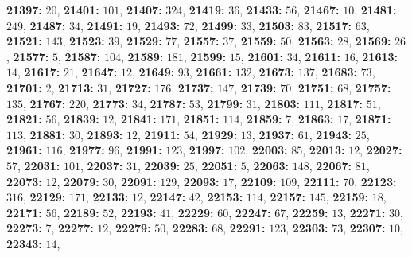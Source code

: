 \textsf{\bfseries 21397:} $20$, \textsf{\bfseries 21401:} $101$, \textsf{\bfseries 21407:} $324$, \textsf{\bfseries 21419:} $36$, \textsf{\bfseries 21433:} $56$, \textsf{\bfseries 21467:} $10$, \textsf{\bfseries 21481:} $249$, \textsf{\bfseries 21487:} $34$, \textsf{\bfseries 21491:} $19$, \textsf{\bfseries 21493:} $72$, \textsf{\bfseries 21499:} $33$, \textsf{\bfseries 21503:} $83$, \textsf{\bfseries 21517:} $63$, \textsf{\bfseries 21521:} $143$, \textsf{\bfseries 21523:} $39$, \textsf{\bfseries 21529:} $77$, \textsf{\bfseries 21557:} $37$, \textsf{\bfseries 21559:} $50$, \textsf{\bfseries 21563:} $28$, \textsf{\bfseries 21569:} $26$, \textsf{\bfseries 21577:} $5$, \textsf{\bfseries 21587:} $104$, \textsf{\bfseries 21589:} $181$, \textsf{\bfseries 21599:} $15$, \textsf{\bfseries 21601:} $34$, \textsf{\bfseries 21611:} $16$, \textsf{\bfseries 21613:} $14$, \textsf{\bfseries 21617:} $21$, \textsf{\bfseries 21647:} $12$, \textsf{\bfseries 21649:} $93$, \textsf{\bfseries 21661:} $132$, \textsf{\bfseries 21673:} $137$, \textsf{\bfseries 21683:} $73$, \textsf{\bfseries 21701:} $2$, \textsf{\bfseries 21713:} $31$, \textsf{\bfseries 21727:} $176$, \textsf{\bfseries 21737:} $147$, \textsf{\bfseries 21739:} $70$, \textsf{\bfseries 21751:} $68$, \textsf{\bfseries 21757:} $135$, \textsf{\bfseries 21767:} $220$, \textsf{\bfseries 21773:} $34$, \textsf{\bfseries 21787:} $53$, \textsf{\bfseries 21799:} $31$, \textsf{\bfseries 21803:} $111$, \textsf{\bfseries 21817:} $51$, \textsf{\bfseries 21821:} $56$, \textsf{\bfseries 21839:} $12$, \textsf{\bfseries 21841:} $171$, \textsf{\bfseries 21851:} $114$, \textsf{\bfseries 21859:} $7$, \textsf{\bfseries 21863:} $17$, \textsf{\bfseries 21871:} $113$, \textsf{\bfseries 21881:} $30$, \textsf{\bfseries 21893:} $12$, \textsf{\bfseries 21911:} $54$, \textsf{\bfseries 21929:} $13$, \textsf{\bfseries 21937:} $61$, \textsf{\bfseries 21943:} $25$, \textsf{\bfseries 21961:} $116$, \textsf{\bfseries 21977:} $96$, \textsf{\bfseries 21991:} $123$, \textsf{\bfseries 21997:} $102$, \textsf{\bfseries 22003:} $85$, \textsf{\bfseries 22013:} $12$, \textsf{\bfseries 22027:} $57$, \textsf{\bfseries 22031:} $101$, \textsf{\bfseries 22037:} $31$, \textsf{\bfseries 22039:} $25$, \textsf{\bfseries 22051:} $5$, \textsf{\bfseries 22063:} $148$, \textsf{\bfseries 22067:} $81$, \textsf{\bfseries 22073:} $12$, \textsf{\bfseries 22079:} $30$, \textsf{\bfseries 22091:} $129$, \textsf{\bfseries 22093:} $17$, \textsf{\bfseries 22109:} $109$, \textsf{\bfseries 22111:} $70$, \textsf{\bfseries 22123:} $316$, \textsf{\bfseries 22129:} $171$, \textsf{\bfseries 22133:} $12$, \textsf{\bfseries 22147:} $42$, \textsf{\bfseries 22153:} $114$, \textsf{\bfseries 22157:} $145$, \textsf{\bfseries 22159:} $18$, \textsf{\bfseries 22171:} $56$, \textsf{\bfseries 22189:} $52$, \textsf{\bfseries 22193:} $41$, \textsf{\bfseries 22229:} $60$, \textsf{\bfseries 22247:} $67$, \textsf{\bfseries 22259:} $13$, \textsf{\bfseries 22271:} $30$, \textsf{\bfseries 22273:} $7$, \textsf{\bfseries 22277:} $12$, \textsf{\bfseries 22279:} $50$, \textsf{\bfseries 22283:} $68$, \textsf{\bfseries 22291:} $123$, \textsf{\bfseries 22303:} $73$, \textsf{\bfseries 22307:} $10$, \textsf{\bfseries 22343:} $14$, 
